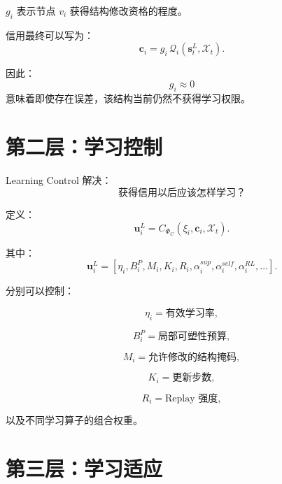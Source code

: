 $g_i$ 表示节点 $v_i$ 获得结构修改资格的程度。

信用最终可以写为：
\begin{equation}
\mathbf{c}_i
=
g_i
\,
\mathcal{Q}_i(
\mathbf{s}_t^L,
\mathcal{X}_t
).
\end{equation}

因此：
\begin{equation}
g_i\approx0
\end{equation}
意味着即使存在误差，该结构当前仍然不获得学习权限。


\section{第二层：学习控制}

Learning Control 解决：
\begin{equation}
\boxed{
\text{获得信用以后应该怎样学习？}
}
\end{equation}

定义：
\begin{equation}
\mathbf{u}_i^L
=
C_{\Phi_C}
(
\xi_i,
\mathbf{c}_i,
\mathcal{X}_t
).
\end{equation}

其中：
\begin{equation}
\mathbf{u}_i^L
=
[
\eta_i,
B_i^P,
M_i,
K_i,
R_i,
\alpha_i^{sup},
\alpha_i^{self},
\alpha_i^{RL},
\ldots
].
\end{equation}

分别可以控制：

\begin{equation}
\eta_i
=
\text{有效学习率},
\end{equation}

\begin{equation}
B_i^P
=
\text{局部可塑性预算},
\end{equation}

\begin{equation}
M_i
=
\text{允许修改的结构掩码},
\end{equation}

\begin{equation}
K_i
=
\text{更新步数},
\end{equation}

\begin{equation}
R_i
=
\text{Replay 强度},
\end{equation}

以及不同学习算子的组合权重。


\section{第三层：学习适应}

